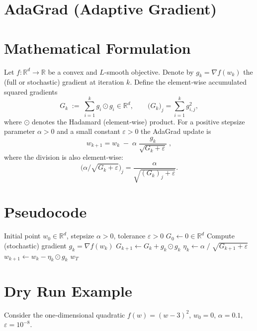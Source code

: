 \documentclass{article}
\newcommand{\R}{\mathbb{R}}
\begin{document}
\section*{AdaGrad (Adaptive Gradient) }

\section*{Mathematical Formulation}
Let $f:\R^{d}\rightarrow\R$ be a convex and $L$-smooth objective.  
Denote by $g_{k}=\nabla f(w_{k})$ the (full or stochastic) gradient at iteration $k$.  
Define the element‑wise accumulated squared gradients
\[
G_{k}\;:=\;\sum_{i=1}^{k} g_{i}\odot g_{i}\in\R^{d},
\qquad 
\bigl(G_{k}\bigr)_{j}=\sum_{i=1}^{k} g_{i,j}^{2},
\]
where $\odot$ denotes the Hadamard (element‑wise) product.  
For a positive stepsize parameter $\alpha>0$ and a small constant $\varepsilon>0$ the AdaGrad update is
\[
\boxed{
w_{k+1}= w_{k}\;-\;\alpha\;\frac{g_{k}}{\sqrt{G_{k}+\varepsilon}}\;,
}
\tag{1}
\]
where the division is also element‑wise:
\[
\bigl(\alpha/\sqrt{G_{k}+\varepsilon}\bigr)_{j}
   =\frac{\alpha}{\sqrt{(G_{k})_{j}+\varepsilon}} .
\]

\section*{Pseudocode}
\begin{algorithm}[H]
\caption{AdaGrad}
\begin{algorithmic}[1]
\Require Initial point $w_{0}\in\R^{d}$, stepsize $\alpha>0$, tolerance $\varepsilon>0$
\State $G_{0}\gets 0\in\R^{d}$ 
    \State Compute (stochastic) gradient $g_{k}= \nabla f(w_{k})$
    \State $G_{k+1}\gets G_{k}+g_{k}\odot g_{k}$ 
    \State $ \eta_{k}\gets \alpha\;/\;\sqrt{G_{k+1}+\varepsilon}$ 
    \State $w_{k+1}\gets w_{k}-\eta_{k}\odot g_{k}$ 
\EndFor
\State \Return $w_{T}$
\end{algorithmic}
\end{algorithm}

\section*{Dry Run Example}
Consider the one‑dimensional quadratic $f(w)=(w-3)^{2}$, $w_{0}=0$, $\alpha=0.1$, $\varepsilon=10^{-8}$.
\end{document}
